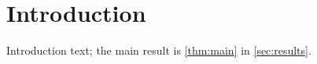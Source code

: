 \section{Introduction}
\label{sec:introduction}

Introduction text; the main result is \cref{thm:main} in \cref{sec:results}.
